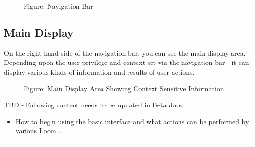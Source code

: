 \documentclass[letterpaper,10pt,english]{sphinxmanual}
\begin{document}
\begin{figure}[htbp]
\centering
\capstart

\noindent{}
\caption{Figure: Navigation Bar}\label{\detokenize{loom_getting_started_guide:id17}}\end{figure}


\subsection{Main Display}
\label{\detokenize{loom_getting_started_guide:main-display}}
On the right hand side of the navigation bar, you can see the main display area. Depending upon the user privilege and context set via the navigation bar - it can display various kinds of information and results of user actions.

\begin{figure}[htbp]
\centering
\capstart

\noindent{}
\caption{Figure: Main Display Area Showing Context Sensitive Information}\label{\detokenize{loom_getting_started_guide:id18}}\end{figure}

TBD - Following content needs to be updated in Beta docs.
\begin{itemize}
\item {} 
How to begin using the basic interface and what actions can be performed by various Loom .

\end{itemize}


\bigskip\hrule\bigskip
\end{document}
